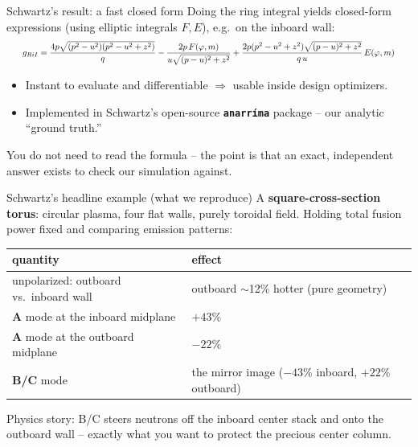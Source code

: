 \documentclass[aspectratio=169]{beamer}
\newcommand{\keyword}[1]{\textcolor{blue!60!black}{\textbf{#1}}}
\begin{document}
\begin{frame}{Schwartz's result: a fast closed form}
  Doing the ring integral yields \alert{closed-form expressions} (using elliptic integrals $F,E$), e.g.\ on the inboard wall:
  \[\resizebox{0.96\linewidth}{!}{$\displaystyle
    g_{RiI}=\frac{4p\sqrt{(p^2-u^2)(p^2-u^2+z^2)}}{q}
    -\frac{2p\,F(\varphi,m)}{u\sqrt{(p-u)^2+z^2}}
    +\frac{2p(p^2-u^2+z^2)\sqrt{(p-u)^2+z^2}}{q\,u}\,E(\varphi,m)
  $}\]
  \begin{itemize}
    \item \alert{Instant} to evaluate and \alert{differentiable} $\Rightarrow$ usable inside design optimizers.
    \item Implemented in Schwartz's open-source \keyword{\texttt{anarr\'ima}} package -- our analytic ``ground truth.''
  \end{itemize}
  \vfill
  \footnotesize You do not need to read the formula -- the point is that an \alert{exact, independent} answer exists to check our simulation against.
\end{frame}

\begin{frame}{Schwartz's headline example (what we reproduce)}
  A \keyword{square-cross-section torus}: circular plasma, four flat walls, purely toroidal field. Holding total fusion power fixed and comparing emission patterns:
  \begin{center}\footnotesize
  \begin{tabular}{ll}
    \toprule
    quantity & effect \\
    \midrule
    unpolarized: outboard vs.\ inboard wall & outboard $\sim$12\% hotter (pure geometry) \\
    \keyword{A} mode at the inboard midplane & $+43\%$ \\
    \keyword{A} mode at the outboard midplane & $-22\%$ \\
    \keyword{B/C} mode & the mirror image ($-43\%$ inboard, $+22\%$ outboard) \\
    \bottomrule
  \end{tabular}
  \end{center}
  \vfill
  \alert{Physics story:} B/C steers neutrons \alert{off the inboard center stack} and onto the outboard wall -- exactly what you want to protect the precious center column.
\end{frame}

\end{document}
